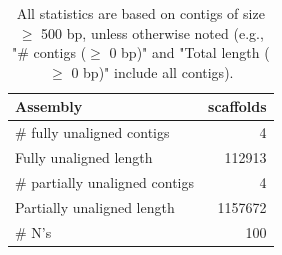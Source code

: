 \documentclass[12pt,a4paper]{article}
\begin{document}
\begin{table}[ht]
\begin{center}
\caption{All statistics are based on contigs of size $\geq$ 500 bp, unless otherwise noted (e.g., "\# contigs ($\geq$ 0 bp)" and "Total length ($\geq$ 0 bp)" include all contigs).}
\begin{tabular}{|l*{1}{|r}|}
\hline
Assembly & scaffolds \\ \hline
\# fully unaligned contigs & 4 \\ \hline
Fully unaligned length & 112913 \\ \hline
\# partially unaligned contigs & 4 \\ \hline
Partially unaligned length & 1157672 \\ \hline
\# N's & 100 \\ \hline
\end{tabular}
\end{center}
\end{table}
\end{document}
